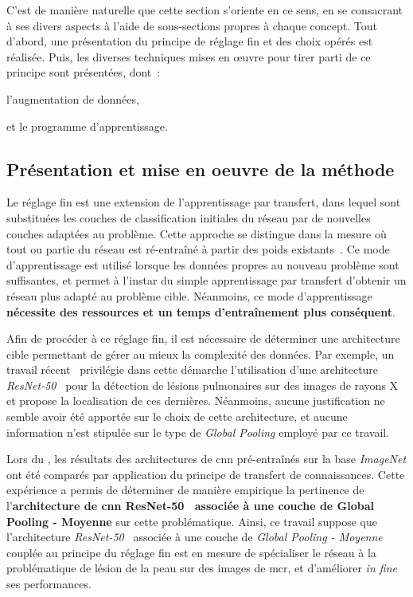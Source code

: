 C'est de manière naturelle que cette section s'oriente en ce sens, en se consacrant à ses divers aspects à l'aide de sous-sections propres à chaque concept. Tout d'abord, une présentation du principe de réglage fin et des choix opérés est réalisée. Puis, les diverses techniques mises en œuvre pour tirer parti de ce principe sont présentées, dont~:
\begin{inlinerate}
    \item l'augmentation de données,
    \item et le programme d'apprentissage.
\end{inlinerate}\par

\subsection{Présentation et mise en oeuvre de la méthode}
Le réglage fin est une extension de l'apprentissage par transfert, dans lequel sont substituées les couches de classification initiales du réseau par de nouvelles couches adaptées au problème. Cette approche se distingue dans la mesure où tout ou partie du réseau est ré-entraîné à partir des poids existants~\cite{Tajbakhsh2016}. Ce mode d'apprentissage est utilisé lorsque les données propres au nouveau problème sont suffisantes, et permet à l'instar du simple apprentissage par transfert d'obtenir un réseau plus adapté au problème cible. Néanmoins, ce mode d'apprentissage \textbf{nécessite des ressources et un temps d'entraînement plus conséquent}.\par

Afin de procéder à ce réglage fin, il est nécessaire de déterminer une architecture cible permettant de gérer au mieux la complexité des données. Par exemple, un travail récent~\cite{Park2019} privilégie dans cette démarche l'utilisation d'une architecture \textit{ResNet-50}~\cite{He2016} pour la détection de lésions pulmonaires sur des images de rayons X et propose la localisation de ces dernières. Néanmoins, aucune justification ne semble avoir été apportée sur le choix de cette architecture, et aucune information n'est stipulée sur le type de \textit{Global Pooling} employé par ce travail.\par

Lors du , les résultats des architectures de \gls{cnn} pré-entraînés sur la base \textit{ImageNet} ont été comparés par application du principe de transfert de connaissances. Cette expérience a permis de déterminer de manière empirique la pertinence de l'\textbf{architecture de \gls{cnn} ResNet-50~\cite{He2016} associée à une couche de Global Pooling - Moyenne} sur cette problématique. Ainsi, ce travail suppose que l'architecture \textit{ResNet-50}~\cite{He2016} associée à une couche de \textit{Global Pooling - Moyenne} couplée au principe du réglage fin est en mesure de spécialiser le réseau à la problématique de lésion de la peau sur des images de \gls{mcr}, et d'améliorer \textit{in fine} ses performances.\par

